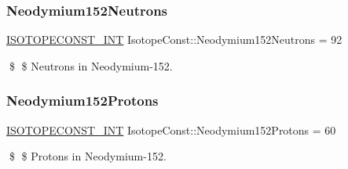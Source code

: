 \subsubsection{\texorpdfstring{Neodymium152\+Neutrons}{Neodymium152Neutrons}}
{\footnotesize\ttfamily \mbox{\hyperlink{group___isotope_const-_macros_ga5f18360b3e99483a35c32d789e62621c}{I\+S\+O\+T\+O\+P\+E\+C\+O\+N\+S\+T\+\_\+\+I\+NT}} Isotope\+Const\+::\+Neodymium152\+Neutrons = 92}

\$ \$ Neutrons in Neodymium-\/152. \mbox{\label{group___isotope_const-_neodymium-_nd152_ga3c7a49ac0a067dd34a0bd091e7fdbc4e}} 
\subsubsection{\texorpdfstring{Neodymium152\+Protons}{Neodymium152Protons}}
{\footnotesize\ttfamily \mbox{\hyperlink{group___isotope_const-_macros_ga5f18360b3e99483a35c32d789e62621c}{I\+S\+O\+T\+O\+P\+E\+C\+O\+N\+S\+T\+\_\+\+I\+NT}} Isotope\+Const\+::\+Neodymium152\+Protons = 60}

\$ \$ Protons in Neodymium-\/152. 